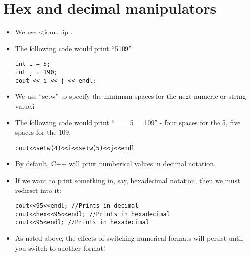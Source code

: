 \documentclass{article}
\begin{document}
\section{Hex and decimal manipulators}
\begin{itemize}
\item  We use \textless iomanip \textmore.
\item The following code would print ``5109''
\begin{lstlisting}
int i = 5;
int j = 190;
cout << i << j << endl;
\end{lstlisting}
\item  We use ``setw'' to specify the minimum spaces for the next numeric or string value.i
\item  The following code would print ``\_\_\_5\_\_109'' - four spaces for the 5, five spaces for the 109:
\begin{lstlisting}
cout<<setw(4)<<i<<setw(5)<<j<<endl
\end{lstlisting}
\item By default, C++ will print numberical values in decimal notation.
\item If we want to print something in, say, hexadecimal notation, then we must redirect into it:
\begin{lstlisting}
cout<<95<<endl; //Prints in decimal
cout<<hex<<95<<endl; //Prints in hexadecimal
cout<<95<endl; //Prints in hexadecimal
\end{lstlisting}
\item As noted above, the effects of switching numerical formats will persist until you switch to another format!
\end{itemize}
\end{document}
